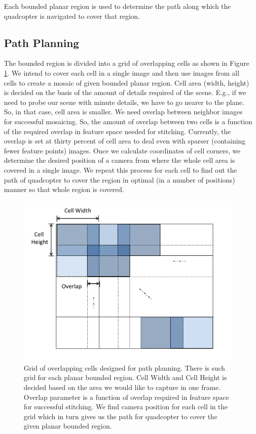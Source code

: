 Each bounded planar region is used to determine the path along which
the quadcopter is navigated to cover that region.

\subsection{Path Planning}
The bounded region is divided into a grid of overlapping cells as shown in
Figure \ref{fig:grid}. We intend to cover each cell in a single image and then
use images from all cells to create a mosaic of given bounded planar
region. Cell area (width, height) is decided on the basis of the amount of details required of the
scene. E.g., if we need to probe our scene with minute details, we have to go
nearer to the plane. So, in that case, cell area is smaller. We need
overlap between neighbor images for successful mosaicing. So, the amount of
overlap between two cells is a function of the required overlap in feature space
needed for stitching. Currently, the overlap is set at thirty percent of cell area to deal
even with sparser (containing fewer feature points) images. Once we
calculate coordinates of cell corners, we determine the desired position of
a camera from where the whole cell area is covered in a single image. We repeat
this process for each cell to find out the path of quadcopter to cover the region in
optimal (in a number of positions) manner so that whole region is covered.

\begin{figure}[h!]
\centering
\includegraphics[width=\linewidth]{figures/multiplanar/PathPlanningGrid}
\caption[Path planning]{Grid of overlapping cells designed for path planning.
There is such grid for each planar bounded region. Cell Width and Cell Height is decided based
on the area we would like to capture in one frame. Overlap parameter is
a function of overlap required in feature space for successful stitching.
We find camera position for each cell in the grid which in turn
gives us the path for quadcopter to cover the given planar bounded region.}
\label{fig:grid}
\end{figure}

